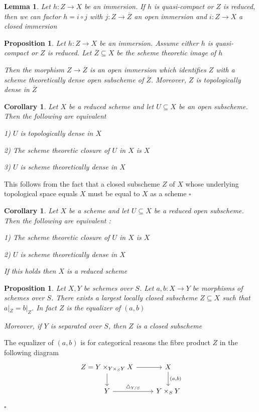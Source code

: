 \documentclass{article}
\newtheorem{lemma}[theorem]{Lemma}
\newtheorem{corollary}[theorem]{Corollary}
\newtheorem{proposition}[theorem]{Proposition}
\newenvironment{Proof}{{\noindent \indent \it Proof:\quad}}{\hfill $\square$\par}
\begin{document}
\begin{lemma}
    Let $h:Z \to X$ be an immersion. If $h$ is quasi-compact or $Z$  is reduced, then we can factor $h=i\circ j$ with $j:Z \to \overline Z$ an open immersion and $i:Z \to X$ a closed immersion
\end{lemma}

\begin{proposition}
Let $h:Z\to X$ be an immersion. Assume either $h$ is quasi-compact or $Z$ is reduced. Let $\overline Z \subseteq X$ be the scheme theoretic image of $h$

Then the morphism $Z \to \overline Z$ is an open immersion which identifies $Z$ with a scheme theoretically dense open subscheme of $\overline Z$. Moreover, $Z$ is topologically dense in $\overline Z$
\end{proposition}

\begin{corollary}
    Let $X$ be a reduced scheme and let $U \subseteq X$ be an open subscheme. Then the following are equivalent

1) $U$ is topologically dense in $X$

2) The scheme theoretic closure of $U$ in $X$ is $X$

3) $U$ is scheme theoretically dense in $X$
\end{corollary}
\begin{Proof}
    This follows from the fact that a closed subscheme $Z$ of $X$ whose underlying topological space equals $X$ must be equal to $X$ as a scheme
\end{Proof}

\begin{corollary}
    Let $X$ be a scheme and let $U\subseteq X$ be a reduced open subscheme. Then the following are equivalent :

1) The scheme theoretic closure of $U$ in $X$ is $X$

2) $U$ is scheme theoretically dense in $X$

If this holds then $X$ is a reduced scheme
\end{corollary}


\begin{proposition}
    Let $X, Y$ be schemes over $S$. Let $a,b:X \to Y$ be morphisms of schemes over $S$. There exists a largest locally closed subscheme $Z \subseteq X$ such that $a|_Z=b|_Z$. In fact $Z$ is the equalizer of $(a,b)$
    
    Moreover, if $Y$ is separated over $S$, then $Z$ is a closed subscheme
\end{proposition}
\begin{Proof}
    The equalizer of $(a,b)$ is for categorical reasons the fibre product $Z$ in the following diagram
    \[\begin{tikzcd}
	{Z=Y\times_{Y\times_S Y}X} & X \\
	Y & {Y\times_S Y}
	\arrow["{(a,b)}", from=1-2, to=2-2]
	\arrow["{\triangle_{Y/S}}", from=2-1, to=2-2]
	\arrow[from=1-1, to=2-1]
	\arrow[from=1-1, to=1-2]
\end{tikzcd}\]
\end{Proof}
\end{document}
